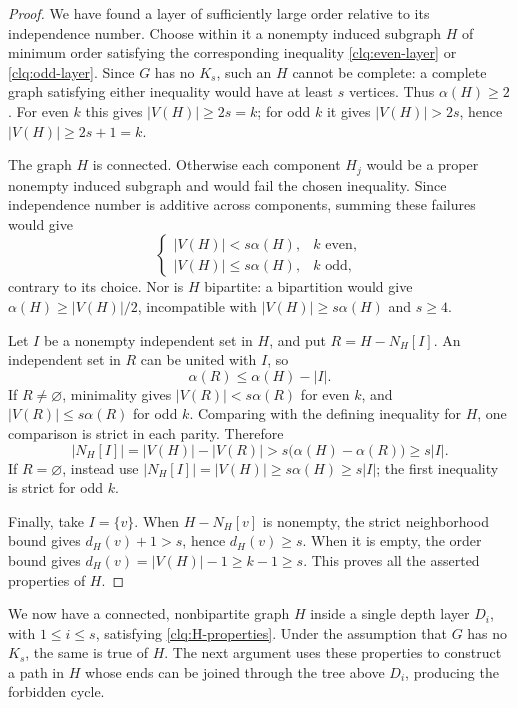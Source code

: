 \begin{proof}
We have found a layer of sufficiently large order relative to its
independence number.  Choose within it a nonempty induced subgraph
\(H\) of minimum order satisfying the corresponding inequality
\eqref{clq:even-layer} or \eqref{clq:odd-layer}.  Since \(G\) has
no \(K_s\), such an \(H\) cannot be complete: a complete graph
satisfying either inequality would have at least \(s\) vertices.
Thus \(\alpha(H)\ge2\).  For even \(k\) this gives
\(|V(H)|\ge2s=k\); for odd \(k\) it gives
\(|V(H)|>2s\), hence \(|V(H)|\ge2s+1=k\).

The graph \(H\) is connected.  Otherwise each component \(H_j\)
would be a proper nonempty induced subgraph and would fail the
chosen inequality.  Since independence number is additive across
components, summing these failures would give
\[
 \begin{cases}
 |V(H)|<s\alpha(H),&k\text{ even},\\
 |V(H)|\le s\alpha(H),&k\text{ odd},
 \end{cases}
\]
contrary to its choice.  Nor is \(H\) bipartite: a bipartition
would give \(\alpha(H)\ge |V(H)|/2\), incompatible with
\(|V(H)|\ge s\alpha(H)\) and \(s\ge4\).

Let \(I\) be a nonempty independent set in \(H\), and put
\(R=H-N_H[I]\).  An independent set in \(R\) can be united with
\(I\), so
\[
 \alpha(R)\le\alpha(H)-|I|.
\]
If \(R\ne\varnothing\), minimality gives
\(|V(R)|<s\alpha(R)\) for even \(k\), and
\(|V(R)|\le s\alpha(R)\) for odd \(k\).  Comparing with the
defining inequality for \(H\), one comparison is strict in each
parity.  Therefore
\[
 |N_H[I]|=|V(H)|-|V(R)|
   >s\bigl(\alpha(H)-\alpha(R)\bigr)\ge s|I|.
\]
If \(R=\varnothing\), instead use
\(|N_H[I]|=|V(H)|\ge s\alpha(H)\ge s|I|\); the first
inequality is strict for odd \(k\).

Finally, take \(I=\{v\}\).  When \(H-N_H[v]\) is nonempty, the
strict neighborhood bound gives \(d_H(v)+1>s\), hence
\(d_H(v)\ge s\).  When it is empty, the order bound gives
\(d_H(v)=|V(H)|-1\ge k-1\ge s\).  This proves all the asserted
properties of \(H\).
\end{proof}

We now have a connected, nonbipartite graph \(H\) inside a single
depth layer \(D_i\), with \(1\le i\le s\), satisfying
\eqref{clq:H-properties}.  Under the assumption that \(G\) has no
\(K_s\), the same is true of \(H\).  The next argument uses these
properties to construct a path in \(H\) whose ends can be joined
through the tree above \(D_i\), producing the forbidden cycle.
